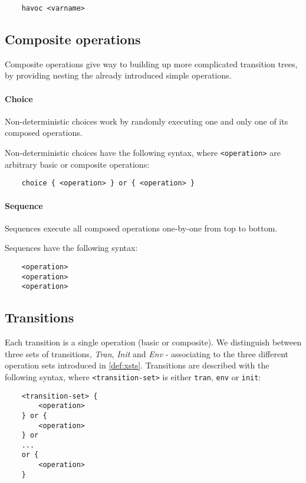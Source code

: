 \begin{Verbatim}
	havoc <varname>
\end{Verbatim}

\subsection{Composite operations}

Composite operations give way to building up more complicated transition trees, by providing nesting the already introduced simple operations.

\paragraph{Choice}

Non-deterministic choices work by randomly executing one and only one of its composed operations.

Non-deterministic choices have the following syntax, where \verb|<operation>| are arbitrary basic or composite operations:

\begin{Verbatim}
	choice { <operation> } or { <operation> }
\end{Verbatim}

\paragraph{Sequence}

Sequences execute all composed operations one-by-one from top to bottom.

Sequences have the following syntax:

\begin{Verbatim}
	<operation>
	<operation>
	<operation>
\end{Verbatim}

\subsection{Transitions}

Each transition is a single operation (basic or composite). We distinguish between three sets of transitions, \emph{Tran}, \emph{Init} and \emph{Env} - associating to the three different operation sets introduced in \autoref{def:xsts}. Transitions are described with the following syntax, where \verb|<transition-set>| is either \verb|tran|, \verb|env| or \verb|init|:

\begin{Verbatim}
	<transition-set> {
		<operation>
	} or {
		<operation>
	} or
	...
	or {
		<operation>
	}
	
\end{Verbatim}
